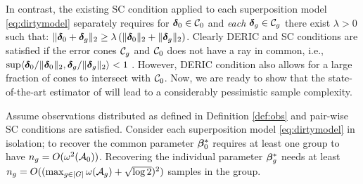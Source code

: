 In contrast, the existing SC condition \cite{guba16, mctr13} applied to each superposition model \eqref{eq:dirtymodel} separately requires for $\boldsymbol{\delta}_0 \in {\cal C}_0$ and {\em each} $\boldsymbol{\delta}_g \in {\cal C}_g$ there exist $\lambda > 0$ such that: $\|\boldsymbol{\delta}_0 + \boldsymbol{\delta}_g\|_{2} \geq  \lambda \left(\|\boldsymbol{\delta}_0\|_{2} + \|\boldsymbol{\delta}_g\|_{2} \right)$.
Clearly DERIC and SC conditions are satisfied if the error cones ${\cal C}_g$ and ${\cal C}_0$ does not have a ray in common, i.e., $\sup \langle \boldsymbol{\delta}_0/\|\boldsymbol{\delta}_0\|_{2}, \boldsymbol{\delta}_g/\|\boldsymbol{\delta}_g\|_{2} \rangle < 1$ \cite{trop15, guba16}. However, DERIC condition also allows for a large fraction of cones to intersect with ${\cal C}_0$.
%
Now, we are ready to show that the state-of-the-art estimator of \cite{guba16} will lead to a considerably pessimistic sample complexity.
\begin{prop}
	\label{prop:super}
	Assume observations distributed as defined in Definition \ref{def:obs} and pair-wise SC conditions are satisfied.  Consider each superposition model \eqref{eq:dirtymodel} in isolation; to recover the common parameter $\boldsymbol{\beta} _0^*$ requires at least one group to have $n_g = O(\omega^2({\cal A}_0))$.
	Recovering the individual parameter $\boldsymbol{\beta}^*_g$ needs at least $n_g =  O((\max_{g \in [G]}\omega({\cal A}_g) + \sqrt{\log 2})^2)$ samples in the group.
\end{prop}

